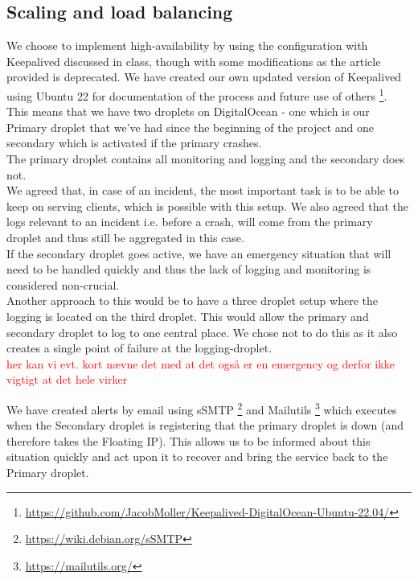 \subsection{Scaling and load balancing}
We choose to implement high-availability by using the configuration with Keepalived discussed in class, though with some modifications as the article\cite{KeepalivedUbuntu14} provided is deprecated. We have created our own updated version of Keepalived using Ubuntu 22 for documentation of the process and future use of others \footnote{\url{https://github.com/JacobMoller/Keepalived-DigitalOcean-Ubuntu-22.04/}}. \\
This means that we have two droplets on DigitalOcean - one which is our Primary droplet that we've had since the beginning of the project and one secondary which is activated if the primary crashes. \\
The primary droplet contains all monitoring and logging and the secondary does not. \\
We agreed that, in case of an incident, the most important task is to be able to keep on serving clients, which is possible with this setup. We also agreed that the logs relevant to an incident i.e. before a crash, will come from the primary droplet and thus still be aggregated in this case.\\ If the secondary droplet goes active, we have an emergency situation that will need to be handled quickly and thus the lack of logging and monitoring is considered non-crucial. \\

Another approach to this would be to have a three droplet setup where the logging is located on the third droplet. This would allow the primary and secondary droplet to log to one central place. We chose not to do this as it also creates a single point of failure at the logging-droplet.\\
\textcolor{red}{her kan vi evt. kort nævne det med at det også er en emergency og derfor ikke vigtigt at det hele virker}

We have created alerts by email using sSMTP \footnote{\url{https://wiki.debian.org/sSMTP}} and Mailutils \footnote{\url{https://mailutils.org/}} which executes when the Secondary droplet is registering that the primary droplet is down (and therefore takes the Floating IP). This allows us to be informed about this situation quickly and act upon it to recover and bring the service back to the Primary droplet.




